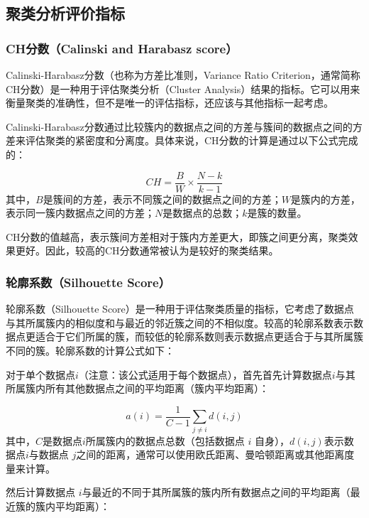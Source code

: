 \documentclass[UTF8,12pt]{ctexart}
\begin{document}
	\subsection{聚类分析评价指标}
	
	\subsubsection{CH分数（Calinski and Harabasz score）}
	
	Calinski-Harabasz分数（也称为方差比准则，Variance Ratio Criterion，通常简称CH分数）是一种用于评估聚类分析（Cluster Analysis）结果的指标。它可以用来衡量聚类的准确性，但不是唯一的评估指标，还应该与其他指标一起考虑。
	
	Calinski-Harabasz分数通过比较簇内的数据点之间的方差与簇间的数据点之间的方差来评估聚类的紧密度和分离度。具体来说，CH分数的计算是通过以下公式完成的：
	
	\begin{equation}
		CH = \dfrac{B}{W} \times \dfrac{N - k}{k - 1}
	\end{equation}
	其中，$B$是簇间的方差，表示不同簇之间的数据点之间的方差；$W$是簇内的方差，表示同一簇内数据点之间的方差；$N$是数据点的总数；$k$是簇的数量。
	
	CH分数的值越高，表示簇间方差相对于簇内方差更大，即簇之间更分离，聚类效果更好。因此，较高的CH分数通常被认为是较好的聚类结果。
	
	\subsubsection{轮廓系数（Silhouette Score）}
	
	轮廓系数（Silhouette Score）是一种用于评估聚类质量的指标，它考虑了数据点与其所属簇内的相似度和与最近的邻近簇之间的不相似度。较高的轮廓系数表示数据点更适合于它们所属的簇，而较低的轮廓系数则表示数据点更适合于与其所属簇不同的簇。轮廓系数的计算公式如下：
	
	对于单个数据点$i$（注意：该公式适用于每个数据点），首先首先计算数据点$i$与其所属簇内所有其他数据点之间的平均距离（簇内平均距离）：
	
	\begin{equation}
		a(i) = \dfrac{1}{C - 1} \sum_{j \neq i} d(i, j) 
	\end{equation}
	其中，$C$是数据点$i$所属簇内的数据点总数（包括数据点 $i$ 自身），$d(i, j)$表示数据点$i$与数据点 $j$之间的距离，通常可以使用欧氏距离、曼哈顿距离或其他距离度量来计算。
	
	然后计算数据点 $i$与最近的不同于其所属簇的簇内所有数据点之间的平均距离（最近簇的簇内平均距离）：
	
\end{document}
